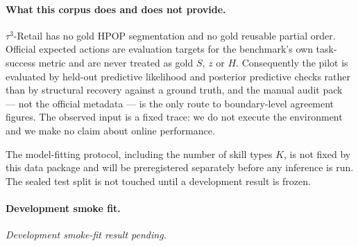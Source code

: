 \paragraph{What this corpus does and does not provide.}
$\tau^3$-Retail has no gold HPOP segmentation and no gold reusable partial
order. Official expected actions are evaluation targets for the benchmark's own
task-success metric and are never treated as gold $S$, $z$ or $H$. Consequently
the pilot is evaluated by held-out predictive likelihood and posterior
predictive checks rather than by structural recovery against a ground truth, and
the manual audit pack --- not the official metadata --- is the only route to
boundary-level agreement figures. The observed input is a fixed trace: we do not
execute the environment and we make no claim about online performance.

The model-fitting protocol, including the number of skill types $K$, is not
fixed by this data package and will be preregistered separately before any
inference is run. The sealed test split is not touched until a development
result is frozen.

\paragraph{Development smoke fit.}
\textit{Development smoke-fit result pending.}

